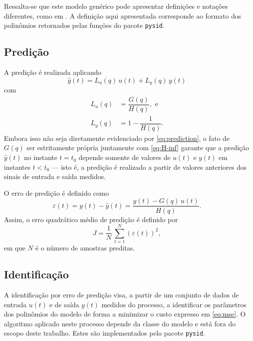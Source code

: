 \documentclass{ppgeesa}
\newcommand{\Prod}{\,}
\begin{document}
Ressalta-se que este modelo genérico pode apresentar definições e notações diferentes, como em \cite{book:Ljung1999, book:Aguirre2007, misc:matlab-polynomial-models}.
A definição aqui apresentada corresponde ao formato dos polinômios retornados pelas funções do pacote \texttt{pysid}.

\subsection{Predição}

A predição é realizada aplicando
\begin{equation}\label{eq:prediction}
  \hat{y}(t) = L_u(q) \Prod u(t) + L_y(q) \Prod y(t)
\end{equation}
com
\begin{align}
  L_u(q) &= \dfrac{G(q)}{H(q)}
  , \text{ e}
  \\
  L_y(q) &= 1 - \dfrac{1}{H(q)}
  .
\end{align}
Embora isso não seja diretamente evidenciado por \eqref{eq:prediction}, o fato de $G(q)$ ser estritamente própria juntamente com \eqref{eq:H-inf} garante que a predição $\hat{y}(t)$ no instante $t = t_0$ depende somente de valores de $u(t)$ e $y(t)$ em instantes $t < t_0$ --- isto é, a predição é realizado a partir de valores anteriores dos sinais de entrada e saída medidos.

O erro de predição é definido como
\begin{equation}
  \varepsilon(t)
  = y(t) - \hat{y}(t)
  = \dfrac{y(t) - G(q) \Prod u(t)}{H(q)}
  .
\end{equation}
Assim, o erro quadrático médio de predição é definido por
\begin{equation}\label{eq:mse}
  J = \dfrac{1}{N} \Prod \sum_{t=1}^{N}{\left(\varepsilon(t)\right)^2}
  ,
\end{equation}
em que $N$ é o número de amostras preditas.

\subsection{Identificação}
A identificação por erro de predição visa, a partir de um conjunto de dados de entrada $u(t)$ e de saída $y(t)$ medidos do processo, a identificar os parâmetros dos polinômios do modelo de forma a minimizar o custo expresso em \eqref{eq:mse}.
O algoritmo aplicado neste processo depende da classe do modelo e está fora do escopo deste trabalho.
Estes são implementados pelo pacote \texttt{pysid}.
\end{document}

